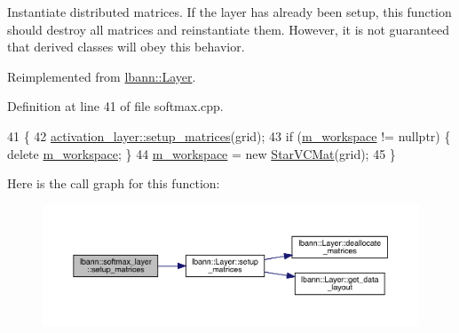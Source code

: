 Instantiate distributed matrices. If the layer has already been setup, this function should destroy all matrices and reinstantiate them. However, it is not guaranteed that derived classes will obey this behavior. 

Reimplemented from \hyperlink{classlbann_1_1Layer_a57bbe21131dc00ab5cf9ea5e3656808e}{lbann\+::\+Layer}.



Definition at line 41 of file softmax.\+cpp.


\begin{DoxyCode}
41                                      \{
42   \hyperlink{classlbann_1_1Layer_a57bbe21131dc00ab5cf9ea5e3656808e}{activation\_layer::setup\_matrices}(grid);
43   \textcolor{keywordflow}{if} (\hyperlink{classlbann_1_1softmax__layer_a604e614de25758f0072308c7efdd5bdb}{m\_workspace} != \textcolor{keyword}{nullptr}) \{ \textcolor{keyword}{delete} \hyperlink{classlbann_1_1softmax__layer_a604e614de25758f0072308c7efdd5bdb}{m\_workspace}; \}
44   \hyperlink{classlbann_1_1softmax__layer_a604e614de25758f0072308c7efdd5bdb}{m\_workspace} = \textcolor{keyword}{new} \hyperlink{base_8hpp_aa4ec814c4a8f15b4ea2b24b3af94ef23}{StarVCMat}(grid);
45 \}
\end{DoxyCode}
Here is the call graph for this function\+:\nopagebreak
\begin{figure}[H]
\begin{center}
\leavevmode
\includegraphics[width=350pt]{classlbann_1_1softmax__layer_ae9472c4f1d22ff51cb7508d17e37c61d_cgraph}
\end{center}
\end{figure}
\mbox{\label{classlbann_1_1softmax__layer_af07463a1d99832d3bf11610311fd7da4}} 
